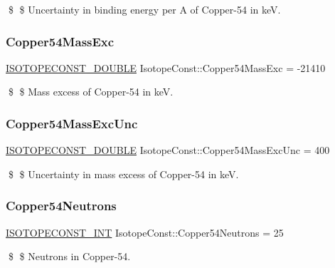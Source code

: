 \$ \$ Uncertainty in binding energy per A of Copper-\/54 in keV. \mbox{\label{group___isotope_const-_copper-_cu54_ga140792571e6d6bc8535be39a7dc74fe3}} 
\subsubsection{\texorpdfstring{Copper54\+Mass\+Exc}{Copper54MassExc}}
{\footnotesize\ttfamily \mbox{\hyperlink{group___isotope_const-_macros_ga8f45a7272ce02c0b4c65c44636ed719a}{I\+S\+O\+T\+O\+P\+E\+C\+O\+N\+S\+T\+\_\+\+D\+O\+U\+B\+LE}} Isotope\+Const\+::\+Copper54\+Mass\+Exc = -\/21410}

\$ \$ Mass excess of Copper-\/54 in keV. \mbox{\label{group___isotope_const-_copper-_cu54_ga4e6b4e4aa80ed338405fd71c1eb7d6f9}} 
\subsubsection{\texorpdfstring{Copper54\+Mass\+Exc\+Unc}{Copper54MassExcUnc}}
{\footnotesize\ttfamily \mbox{\hyperlink{group___isotope_const-_macros_ga8f45a7272ce02c0b4c65c44636ed719a}{I\+S\+O\+T\+O\+P\+E\+C\+O\+N\+S\+T\+\_\+\+D\+O\+U\+B\+LE}} Isotope\+Const\+::\+Copper54\+Mass\+Exc\+Unc = 400}

\$ \$ Uncertainty in mass excess of Copper-\/54 in keV. \mbox{\label{group___isotope_const-_copper-_cu54_gaee177a75e6652cb4249ed9891ad79083}} 
\subsubsection{\texorpdfstring{Copper54\+Neutrons}{Copper54Neutrons}}
{\footnotesize\ttfamily \mbox{\hyperlink{group___isotope_const-_macros_ga5f18360b3e99483a35c32d789e62621c}{I\+S\+O\+T\+O\+P\+E\+C\+O\+N\+S\+T\+\_\+\+I\+NT}} Isotope\+Const\+::\+Copper54\+Neutrons = 25}

\$ \$ Neutrons in Copper-\/54. \mbox{\label{group___isotope_const-_copper-_cu54_gad678c49c90d0f972748ee804bf797e03}} 
